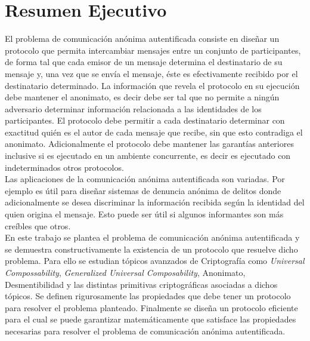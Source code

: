 \section{Resumen Ejecutivo}

El problema de comunicación anónima autentificada consiste en diseñar un protocolo
que permita intercambiar mensajes entre un conjunto de participantes, de forma tal
que cada emisor de un mensaje determina el destinatario de su
mensaje y, una vez que se envía el mensaje,  éste es efectivamente recibido por el destinatario
determinado. La información que revela el protocolo en su ejecución debe mantener el
anonimato, es decir debe ser tal que no permite a ningún adversario determinar 
información relacionada a las identidades  de los participantes.
El protocolo debe permitir a cada destinatario determinar con exactitud quién es el autor
de cada mensaje que recibe, sin que esto contradiga el anonimato.
Adicionalmente el protocolo debe mantener las garantías anteriores inclusive si es ejecutado en
un ambiente concurrente, es decir es ejecutado con indeterminados otros protocolos.\\
Las aplicaciones de la comunicación anónima autentificada son variadas. Por ejemplo es útil
para diseñar sistemas de denuncia anónima de delitos donde adicionalmente se desea dis\-cri\-mi\-nar
la información recibida según la identidad del quien origina el mensaje. Esto puede ser útil si algunos
informantes son más creíbles que otros.\\
En este trabajo se plantea el problema de comunicación anónima autentificada y se
demuestra constructivamente la existencia de un protocolo que resuelve dicho problema.
Para ello se estudian tópicos avanzados de Criptografía como \textit{Universal
Compossability}, \textit{Generalized Universal Composability}, Anonimato,
Desmentibilidad y las distintas primitivas criptográficas asociadas a dichos tópicos.
Se definen rigurosamente las propiedades que debe tener un protocolo para
resolver el problema planteado.
Finalmente se diseña un protocolo eficiente para el cual se puede garantizar
matemáticamente que satisface las propiedades necesarias para resolver el problema
de comunicación anónima autentificada.
